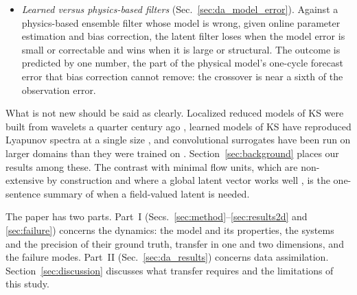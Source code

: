 \begin{itemize}
  interpolating the observations, while an unlocalized filter fails once
  the attractor has more unstable directions than the ensemble has members.
\item \emph{Learned versus physics-based filters} (Sec.~\ref{sec:da_model_error}).
  Against a physics-based ensemble filter whose model is wrong, given
  online parameter estimation and bias correction, the latent filter loses
  when the model error is small or correctable and wins when it is large or
  structural. The outcome is predicted by one number, the part of the
  physical model's one-cycle forecast error that bias correction cannot
  remove: the crossover is near a sixth of the observation error.
\end{itemize}

What is not new should be said as clearly. Localized reduced models of KS
were built from wavelets a quarter century ago \citep{wittenberg2001},
learned models of KS have reproduced Lyapunov spectra at a single size
\citep{pathak2017,vlachas2020,ozalpmagri2025}, and convolutional
surrogates have been run on larger domains than they were trained on
\citep{barsinai2019,kochkov2021}. Section~\ref{sec:background} places our
results among these. The contrast with minimal flow units, which are
non-extensive by construction and where a global latent vector works
well \citep{constanteamores2025}, is the one-sentence summary of when a
field-valued latent is needed.

The paper has two parts. Part~I (Secs.~\ref{sec:method}--\ref{sec:results2d}
and \ref{sec:failure}) concerns the dynamics: the model and its
properties, the systems and the precision of their ground truth, transfer
in one and two dimensions, and the failure modes. Part~II
(Sec.~\ref{sec:da_results}) concerns data assimilation. Section~\ref{sec:discussion}
discusses what transfer requires and the limitations of this study.
